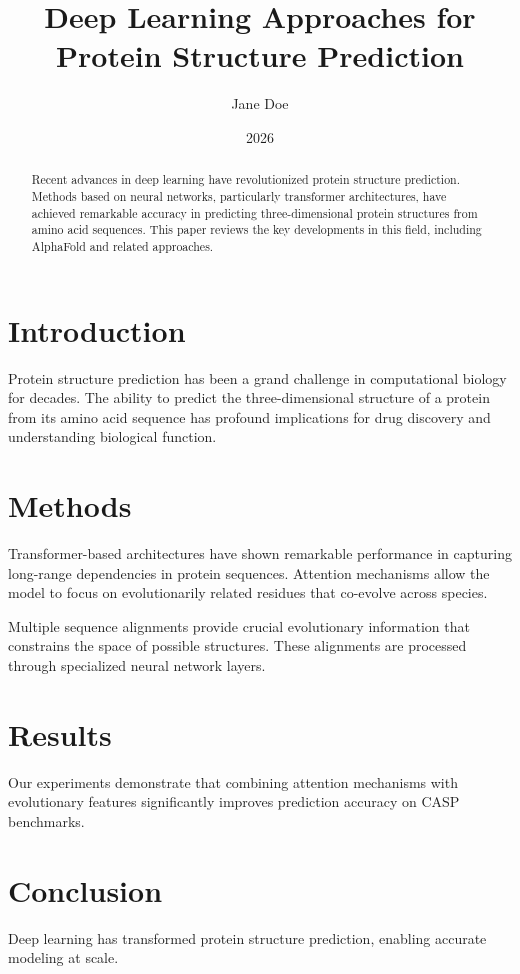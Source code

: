 \documentclass{article}
\title{Deep Learning Approaches for Protein Structure Prediction}
\author{Jane Doe}
\date{2026}
\begin{document}
\maketitle

\begin{abstract}
Recent advances in deep learning have revolutionized protein structure
prediction. Methods based on neural networks, particularly transformer
architectures, have achieved remarkable accuracy in predicting
three-dimensional protein structures from amino acid sequences. This paper
reviews the key developments in this field, including AlphaFold and
related approaches.
\end{abstract}

\section{Introduction}
Protein structure prediction has been a grand challenge in computational
biology for decades. The ability to predict the three-dimensional structure
of a protein from its amino acid sequence has profound implications for
drug discovery and understanding biological function.

\section{Methods}
Transformer-based architectures have shown remarkable performance in
capturing long-range dependencies in protein sequences. Attention
mechanisms allow the model to focus on evolutionarily related residues
that co-evolve across species.

Multiple sequence alignments provide crucial evolutionary information
that constrains the space of possible structures. These alignments are
processed through specialized neural network layers.

\section{Results}
Our experiments demonstrate that combining attention mechanisms with
evolutionary features significantly improves prediction accuracy on
CASP benchmarks.

\section{Conclusion}
Deep learning has transformed protein structure prediction, enabling
accurate modeling at scale.



\end{document}
